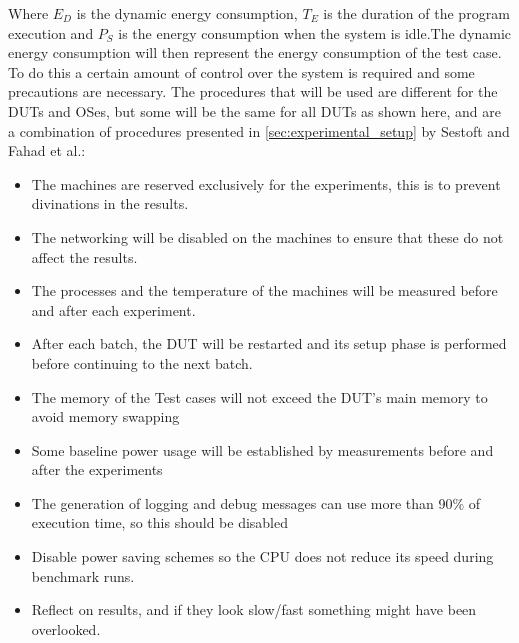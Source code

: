 Where $E_D$ is the dynamic energy consumption, $T_E$ is the duration of the program execution and $P_S$ is the energy consumption when the system is idle.The dynamic energy consumption will then represent the energy consumption of the test case. To do this a certain amount of control over the system is required and some precautions are necessary. The procedures that will be used are different for the DUTs and OSes, but some will be the same for all DUTs as shown here, and are a combination of procedures presented in \cref*{sec:experimental_setup} by Sestoft\cite*[]{sestoft2013microbenchmarks} and Fahad et al.\cite*[]{fahad2019comparative}:

\begin{itemize}
    \item The machines are reserved exclusively for the experiments, this is to prevent divinations in the results.
    \item The networking will be disabled on the machines to ensure that these do not affect the results.
    \item The processes and the temperature of the machines will be measured before and after each experiment.
    \item After each batch, the DUT will be restarted and its setup phase is performed before continuing to the next batch.
    \item The memory of the Test cases will not exceed the DUT's main memory to avoid memory swapping
    \item Some baseline power usage will be established by measurements before and after the experiments
    \item The generation of logging and debug messages can use more than 90\% of execution time, so this should be disabled
    \item Disable power saving schemes so the CPU does not reduce its speed during benchmark runs.
    \item Reflect on results, and if they look slow/fast something might have been overlooked.
\end{itemize}

